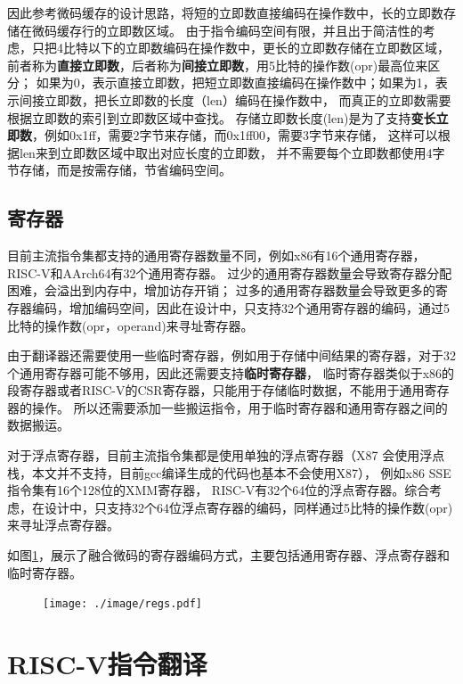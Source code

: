因此参考微码缓存的设计思路，将短的立即数直接编码在操作数中，长的立即数存储在微码缓存行的立即数区域。
由于指令编码空间有限，并且出于简洁性的考虑，只把4比特以下的立即数编码在操作数中，更长的立即数存储在立即数区域，
前者称为\textbf{直接立即数}，后者称为\textbf{间接立即数}，用5比特的操作数(opr)最高位来区分；
如果为0，表示直接立即数，把短立即数直接编码在操作数中；如果为1，表示间接立即数，把长立即数的长度（len）编码在操作数中，
而真正的立即数需要根据立即数的索引到立即数区域中查找。
存储立即数长度(len)是为了支持\textbf{变长立即数}，例如0x1ff，需要2字节来存储，而0x1ff00，需要3字节来存储，
这样可以根据len来到立即数区域中取出对应长度的立即数，
并不需要每个立即数都使用4字节存储，而是按需存储，节省编码空间。


\subsection{寄存器}

目前主流指令集都支持的通用寄存器数量不同，例如x86有16个通用寄存器，RISC-V和AArch64有32个通用寄存器。
过少的通用寄存器数量会导致寄存器分配困难，会溢出到内存中，增加访存开销；
过多的通用寄存器数量会导致更多的寄存器编码，增加编码空间，因此在设计中，只支持32个通用寄存器的编码，通过5比特的操作数(opr，operand)来寻址寄存器。

由于翻译器还需要使用一些临时寄存器，例如用于存储中间结果的寄存器，对于32个通用寄存器可能不够用，因此还需要支持\textbf{临时寄存器}，
临时寄存器类似于x86的段寄存器或者RISC-V的CSR寄存器，只能用于存储临时数据，不能用于通用寄存器的操作。
所以还需要添加一些搬运指令，用于临时寄存器和通用寄存器之间的数据搬运。

对于浮点寄存器，目前主流指令集都是使用单独的浮点寄存器（X87 会使用浮点栈，本文并不支持，目前gcc编译生成的代码也基本不会使用X87），
例如x86 SSE指令集有16个128位的XMM寄存器，
RISC-V有32个64位的浮点寄存器。综合考虑，在设计中，只支持32个64位浮点寄存器的编码，同样通过5比特的操作数(opr)来寻址浮点寄存器。

如图\ref{img:regs}，展示了融合微码的寄存器编码方式，主要包括通用寄存器、浮点寄存器和临时寄存器。

\begin{figure}[h]
  \centering
  \texttt{[image: ./image/regs.pdf]}
  \label{img:regs}
\end{figure}



\section{RISC-V指令翻译}\label{sec:RISC-V-translation}

